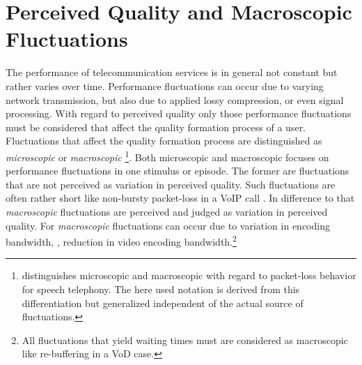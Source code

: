 \section{Perceived Quality and Macroscopic Fluctuations}\label{chap:04}



The performance of telecommunication services is in general not constant but rather varies over time.
Performance fluctuations can occur due to varying network transmission, but also due to applied lossy compression, or even signal processing.
With regard to perceived quality only those performance fluctuations must be considered that affect the quality formation process of a user.
Fluctuations that affect the quality formation process are distinguished as \emph{microscopic} or \emph{macroscopic} \citep[\cf,][p. 72]{raake_short-_2006}
\footnote{\citet{raake_short-_2006} distinguishes microscopic and macroscopic with regard to packet-loss behavior for speech telephony. The here used notation is derived from this differentiation but generalized independent of the actual source of fluctuations.}.
Both microscopic and macroscopic focuses on performance fluctuations in one stimulus or episode.
The former are fluctuations that are not perceived as variation in perceived quality.
Such fluctuations are often rather short like non-bursty packet-loss in a \ac{VoIP} call \citep[\cf,][p. 72]{raake_short-_2006}.
In difference to that \emph{macroscopic} fluctuations are perceived and judged as variation in perceived quality.
For \emph{macroscopic} fluctuations can occur due to variation in encoding bandwidth, \eg, reduction in video encoding bandwidth.\footnote{All fluctuations that yield waiting times must are considered as macroscopic like re-buffering in a \ac{VoD} case.}

